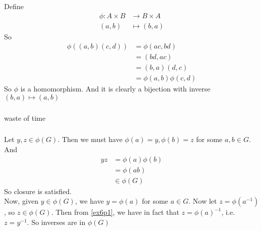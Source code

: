 \documentclass{article}
\newcommand{\inv}[1]{ {#1}^{-1} }
\begin{document}
\subsubsection{}\label{ex6p11}
Define
\begin{align*}
\phi: A \times B &\to B \times A\\
(a,b) &\mapsto (b,a)
\end{align*}
So
\begin{align*}
\phi((a,b)(c,d)) &= \phi(ac,bd)\\
&= (bd,ac)\\
&= (b,a)(d,c)\\
&= \phi(a,b)\phi(c,d)
\end{align*}
So $\phi$ is a homomorphism. And it is clearly a bijection with inverse $(b,a)\mapsto(a,b)$
\subsubsection{}\label{ex6p12}
waste of time
\subsubsection{}\label{ex6p13}
Let $y,z \in \phi(G)$. Then we must have
$\phi(a) = y, \phi(b) = z$ for some $a,b \in G$.\\
And 
\begin{align*}
yz &= \phi(a)\phi(b)\\
&= \phi(ab)\\
&\in \phi(G)
\end{align*}
So closure is satisfied.\\
Now, given $y \in \phi(G)$, we have $y=\phi(a)$ for some $a \in G$. Now let $z = \phi(\inv{a})$, so $z \in \phi(G)$. Then from \ref{ex6p1}, we have in fact that $z = \inv{\phi(a)}$, i.e. $z = \inv{y}$. So inverses are in $\phi(G)$
\end{document}
